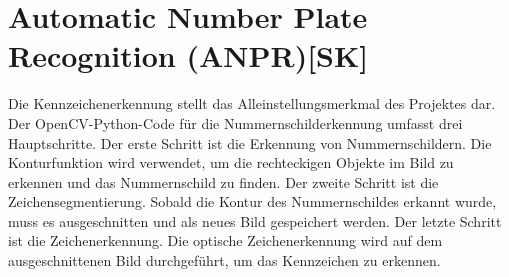 \section{Automatic Number Plate Recognition (ANPR)[SK]}
\label{lsg:def:anpr}
Die Kennzeichenerkennung stellt das Alleinstellungsmerkmal des Projektes dar. Der OpenCV-Python-Code für die Nummernschilderkennung umfasst drei Hauptschritte. Der erste Schritt ist die Erkennung von Nummernschildern. Die Konturfunktion wird verwendet, um die rechteckigen Objekte im Bild zu erkennen und das Nummernschild zu finden. Der zweite Schritt ist die Zeichensegmentierung. Sobald die Kontur des Nummernschildes erkannt wurde, muss es ausgeschnitten und als neues Bild gespeichert werden. Der letzte Schritt ist die Zeichenerkennung. Die optische Zeichenerkennung wird auf dem ausgeschnittenen Bild durchgeführt, um das Kennzeichen zu erkennen.

